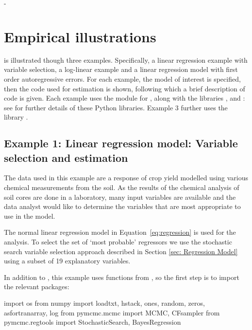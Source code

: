 -\documentclass[article]{jss}
\begin{document}
\section{Empirical illustrations}
\label{sec:Empirical-Illustrations}

 is illustrated though three examples. Specifically, a
linear regression example with variable selection, a log-linear
example and a linear regression model with first order autoregressive
errors.  For each example, the model of interest is specified, then
the code used for estimation is shown, following which a brief
description of code is given. Each example uses the module for
, along with the  libraries ,
 and : see \citet{NumpyScipy, Matplotlib}
for further details of these Python libraries.  Example 3 further uses
the library  \citep{geus11}.


\subsection{Example 1: Linear regression model: Variable selection and
  estimation}

The data used in this example are a response of crop yield modelled
using various chemical measurements from the soil. As the results of
the chemical analysis of soil cores are done in a laboratory, many
input variables are available and the data analyst would like to
determine the variables that are most appropriate to use in the model.

The normal linear regression model in Equation~\ref{eq:regression} is used
for the analysis.  To select the set of `most probable'
regressors we use the stochastic search variable selection approach
described in Section \ref{sec: Regression Model} using a subset of 19
explanatory variables.


In addition to , this example uses functions from
, so the first step is to import the relevant packages:

\begin{Code}
import os
from numpy import loadtxt, hstack, ones, random, zeros, asfortranarray, log
from pymcmc.mcmc import MCMC, CFsampler
from pymcmc.regtools import StochasticSearch, BayesRegression
\end{Code}
\end{document}
